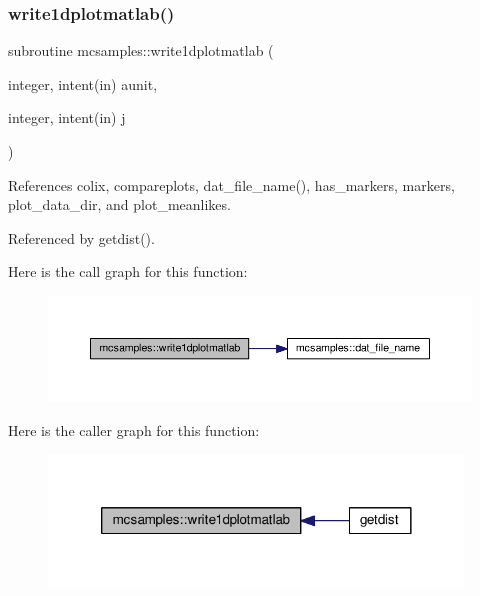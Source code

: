 \subsubsection{\texorpdfstring{write1dplotmatlab()}{write1dplotmatlab()}}
{\footnotesize\ttfamily subroutine mcsamples\+::write1dplotmatlab (\begin{DoxyParamCaption}\item[{integer, intent(in)}]{aunit,  }\item[{integer, intent(in)}]{j }\end{DoxyParamCaption})}



References colix, compareplots, dat\+\_\+file\+\_\+name(), has\+\_\+markers, markers, plot\+\_\+data\+\_\+dir, and plot\+\_\+meanlikes.



Referenced by getdist().

Here is the call graph for this function\+:
\nopagebreak
\begin{figure}[H]
\begin{center}
\leavevmode
\includegraphics[width=350pt]{namespacemcsamples_a0a903a19ac6139be1cc98a32218ec801_cgraph}
\end{center}
\end{figure}
Here is the caller graph for this function\+:
\nopagebreak
\begin{figure}[H]
\begin{center}
\leavevmode
\includegraphics[width=312pt]{namespacemcsamples_a0a903a19ac6139be1cc98a32218ec801_icgraph}
\end{center}
\end{figure}
\mbox{\label{namespacemcsamples_a6ac9a19d5b3622b2a2dea19257a37c36}} 
